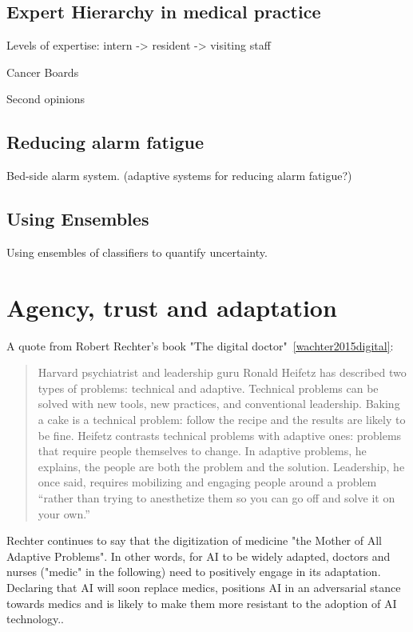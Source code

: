 \documentclass[fleqn,10pt]{wlscirep}
\begin{document}
\subsection*{Expert Hierarchy in medical practice}
Levels of expertise: intern -> resident -> visiting staff

Cancer Boards

Second opinions

\subsection*{Reducing alarm fatigue}
Bed-side alarm system. (adaptive systems for reducing alarm fatigue?)

\subsection*{Using Ensembles}

Using ensembles of classifiers to quantify uncertainty.

\section{Agency, trust and adaptation}

A quote from Robert Rechter's book "The digital doctor"~\ref{wachter2015digital}:
\begin{quote}
    Harvard psychiatrist and leadership guru Ronald Heifetz has described two types of problems: technical and adaptive. Technical problems can be solved with new tools, new practices, and conventional leadership. Baking a cake is a technical problem: follow the recipe and the results are likely to be fine. Heifetz contrasts technical problems with adaptive ones: problems that require people themselves to change. In adaptive problems, he explains, the people
    are both the problem and the solution. Leadership, he once said, requires mobilizing and engaging people around a problem “rather than trying to anesthetize them so you can go off and solve it on your own.” 
\end{quote}

Rechter continues to say that the digitization of medicine "the Mother of All Adaptive Problems". In other words, for AI to be widely adapted, doctors and nurses ("medic" in the following) need to positively engage in its adaptation. Declaring that AI will soon replace medics, positions AI in an adversarial stance towards medics and is likely to make them more resistant to the adoption of AI technology..
\end{document}

